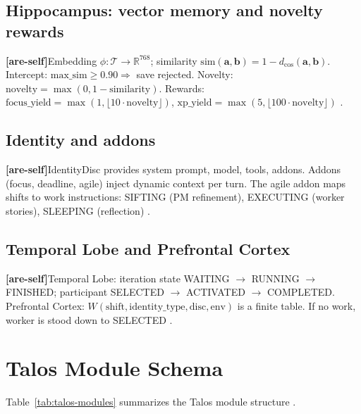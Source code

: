 \documentclass[11pt]{article}
\newcommand{\areself}{\textbf{[are-self]}}
\begin{document}
	\subsection{Hippocampus: vector memory and novelty rewards}
	\areself Embedding $\phi : \mathcal{T} \to \mathbb{R}^{768}$; similarity $\text{sim}(\mathbf{a}, \mathbf{b}) = 1 - d_{\cos}(\mathbf{a}, \mathbf{b})$. Intercept: $\text{max\_sim} \geq 0.90 \Rightarrow$ save rejected. Novelty: $\text{novelty} = \max(0, 1 - \text{similarity})$. Rewards: $\text{focus\_yield} = \max(1, \lfloor 10 \cdot \text{novelty} \rfloor)$, $\text{xp\_yield} = \max(5, \lfloor 100 \cdot \text{novelty} \rfloor)$ \cite{talosHippocampus,talosCombined}.
	
	\subsection{Identity and addons}
	\areself IdentityDisc provides system prompt, model, tools, addons. Addons (focus, deadline, agile) inject dynamic context per turn. The agile addon maps shifts to work instructions: SIFTING (PM refinement), EXECUTING (worker stories), SLEEPING (reflection) \cite{talosIdentity,talosLiveCodebase}.
	
	\subsection{Temporal Lobe and Prefrontal Cortex}
	\areself Temporal Lobe: iteration state WAITING $\to$ RUNNING $\to$ FINISHED; participant SELECTED $\to$ ACTIVATED $\to$ COMPLETED. Prefrontal Cortex: $W(\text{shift}, \text{identity\_type}, \text{disc}, \text{env})$ is a finite table. If no work, worker is stood down to SELECTED \cite{talosTemporal,talosPFC,talosCombined}.
	
	\section{Talos Module Schema}
	\label{are-self:module-schema}
	Table~\ref{tab:talos-modules} summarizes the Talos module structure \cite{talosCombined,talosLiveCodebase}.
	
\end{document}
